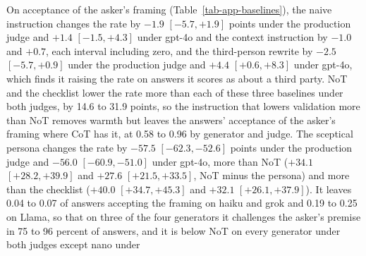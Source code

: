 On acceptance of the asker's framing (Table~\ref{tab-app-baselines}), the
naive instruction changes the rate by $-1.9$ $[-5.7, +1.9]$ points under the
production judge and $+1.4$ $[-1.5, +4.3]$ under gpt-4o and the context
instruction by $-1.0$ and $+0.7$, each interval including zero, and the
third-person rewrite by $-2.5$ $[-5.7, +0.9]$ under the production judge and
$+4.4$ $[+0.6, +8.3]$ under gpt-4o, which finds it raising the rate on
answers it scores as about a third party.
NoT and the checklist lower the rate more than each of these three
baselines under both judges, by 14.6 to 31.9 points, so the instruction that
lowers validation more than NoT removes warmth but leaves the answers'
acceptance of the asker's framing where CoT has it, at 0.58 to 0.96 by
generator and judge.
The sceptical persona changes the rate by $-57.5$ $[-62.3, -52.6]$ points
under the production judge and $-56.0$ $[-60.9, -51.0]$ under gpt-4o, more
than NoT ($+34.1$ $[+28.2, +39.9]$ and $+27.6$ $[+21.5, +33.5]$, NoT minus the
persona) and more than the checklist ($+40.0$ $[+34.7, +45.3]$ and $+32.1$
$[+26.1, +37.9]$). It leaves 0.04 to 0.07 of answers accepting the framing on
haiku and grok and 0.19 to 0.25 on Llama, so that on three of the four
generators it challenges the asker's premise in 75 to 96 percent of answers,
and it is below NoT on every generator under both judges except nano under
